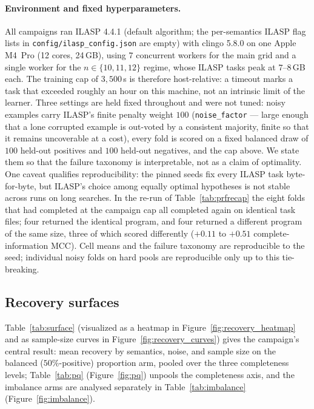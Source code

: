 \documentclass[review,12pt]{elsarticle}
\theoremstyle{definition}
\theoremstyle{remark}
\begin{document}
\paragraph{Environment and fixed hyperparameters.} All campaigns ran ILASP
4.4.1 (default algorithm; the per-semantics ILASP flag lists in
\texttt{config/ilasp\_config.json} are empty) with clingo 5.8.0 on one Apple
M4~Pro (12 cores, 24\,GB), using $7$ concurrent workers for the main grid and
a single worker for the $n\in\{10,11,12\}$ regime, whose ILASP tasks peak at
$7$--$8$\,GB each. The training cap of $3{,}500$\,s is therefore
host-relative: a timeout marks a task that exceeded roughly an hour on this
machine, not an intrinsic limit of the learner. Three settings are held fixed
throughout and were not tuned: noisy examples carry ILASP's finite penalty
weight $100$ (\texttt{noise\_factor} --- large enough that a lone corrupted
example is out-voted by a consistent majority, finite so that it remains
uncoverable at a cost), every fold is scored on a fixed balanced draw of $100$
held-out positives and $100$ held-out negatives, and the cap above. We state
them so that the failure taxonomy is interpretable, not as a claim of
optimality. One caveat qualifies reproducibility: the pinned seeds fix every
ILASP task byte-for-byte, but ILASP's choice among equally optimal hypotheses
is not stable across runs on long searches. In the re-run of
Table~\ref{tab:prfrecap} the eight folds that had completed at the campaign
cap all completed again on identical task files; four returned the identical
program, and four returned a different program of the same size, three of
which scored differently ($+0.11$ to $+0.51$ complete-information MCC). Cell
means and the failure taxonomy are reproducible to the seed; individual noisy
folds on hard pools are reproducible only up to this tie-breaking.

\subsection{Recovery surfaces}
\label{sec:exp1surfaces}

Table~\ref{tab:surface} (visualized as a heatmap in
Figure~\ref{fig:recovery_heatmap} and as sample-size curves in
Figure~\ref{fig:recovery_curves}) gives the campaign's central result: mean
recovery by semantics, noise, and sample size on the balanced ($50\%$-positive)
proportion arm, pooled over the three completeness levels; Table~\ref{tab:pq}
(Figure~\ref{fig:pq}) unpools the completeness axis, and the imbalance arms are
analysed separately in Table~\ref{tab:imbalance} (Figure~\ref{fig:imbalance}).
\end{document}
